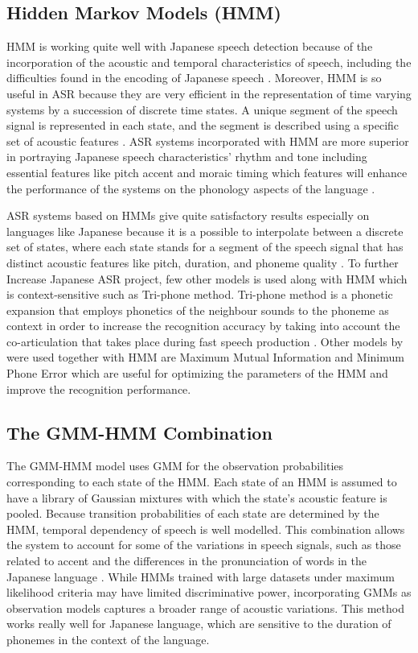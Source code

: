 \subsection{Hidden Markov Models (HMM)}
HMM is working quite well with Japanese speech detection because of the incorporation of the acoustic and temporal characteristics of speech, including the difficulties found in the encoding of Japanese speech \parencite{Tokuda1999Application}. Moreover, HMM is so useful in ASR because they are very efficient in the representation of time varying systems by a succession of discrete time states. A unique segment of the speech signal is represented in each state, and the segment is described using a specific set of acoustic features \parencite{juang1991hidden}. ASR systems incorporated with HMM are more superior in portraying Japanese speech characteristics’ rhythm and tone including essential features like pitch accent and moraic timing which features will enhance the performance of the systems on the phonology aspects of the language \parencite{Tokuda2000HMM}.

ASR systems based on HMMs give quite satisfactory results especially on languages like Japanese because it is a possible to interpolate between a discrete set of states, where each state stands for a segment of the speech signal that has distinct acoustic features like pitch, duration, and phoneme quality \parencite{juang1991hidden}. To further Increase Japanese ASR project, few other models is used along with HMM which is context-sensitive such as Tri-phone method. Tri-phone method is a phonetic expansion that employs phonetics of the neighbour sounds to the phoneme as context in order to increase the recognition accuracy by taking into account the co-articulation that takes place during fast speech production \parencite{Tokuda2000HMM}. Other models by \textcite{gales2008application} were used together with HMM are Maximum Mutual Information and Minimum Phone Error which are useful for optimizing the parameters of the HMM and improve the recognition performance. 


\subsection{The GMM-HMM Combination}
The GMM-HMM model uses GMM for the observation probabilities corresponding to each state of the HMM. Each state of an HMM is assumed to have a library of Gaussian mixtures with which the state’s acoustic feature is pooled. Because transition probabilities of each state are determined by the HMM, temporal dependency of speech is well modelled. This combination allows the system to account for some of the variations in speech signals, such as those related to accent and the differences in the pronunciation of words in the Japanese language \parencite{taheri2006fuzzy}. While HMMs trained with large datasets under maximum likelihood criteria may have limited discriminative power, incorporating GMMs as observation models captures a broader range of acoustic variations. This method works really well for Japanese language, which are sensitive to the duration of phonemes in the context of the language.

